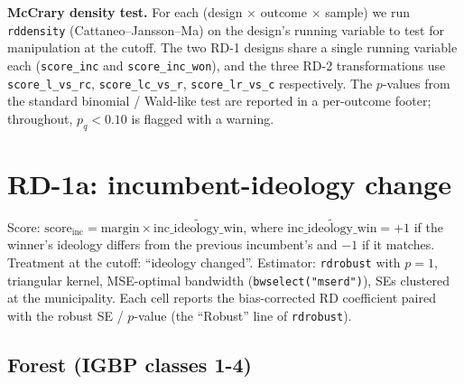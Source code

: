 \documentclass[11pt]{article}
\begin{document}
\textbf{McCrary density test.} For each (design $\times$ outcome
$\times$ sample) we run \texttt{rddensity} (Cattaneo--Jansson--Ma) on
the design's running variable to test for manipulation at the cutoff.
The two RD-1 designs share a single running variable each
(\texttt{score\_inc} and \texttt{score\_inc\_won}), and the three
RD-2 transformations use \texttt{score\_l\_vs\_rc},
\texttt{score\_lc\_vs\_r}, \texttt{score\_lr\_vs\_c} respectively.
The $p$-values from the standard binomial / Wald-like test are reported
in a per-outcome footer; throughout, $p_{q}<0.10$ is flagged with a
warning.

\clearpage
\section{RD-1a: incumbent-ideology change}

Score: $\text{score}_{\text{inc}} = \text{margin}\times\widetilde{\text{inc\_ideology\_win}}$,
where $\widetilde{\text{inc\_ideology\_win}} = +1$ if the winner's
ideology differs from the previous incumbent's and $-1$ if it matches.
Treatment at the cutoff: ``ideology changed''. Estimator:
\texttt{rdrobust} with $p=1$, triangular kernel, MSE-optimal bandwidth
(\texttt{bwselect("mserd")}), SEs clustered at the municipality. Each
cell reports the bias-corrected RD coefficient paired with the robust
SE / $p$-value (the ``Robust'' line of \texttt{rdrobust}).

\subsection{Forest (IGBP classes 1-4)}
\end{document}

